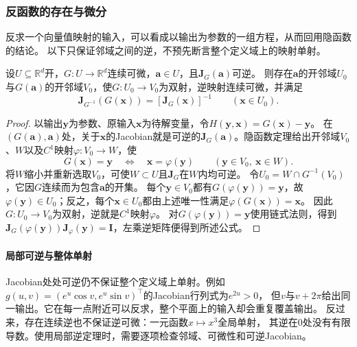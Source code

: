 \subsubsection{反函数的存在与微分}

反求一个向量值映射的输入，可以看成以输出为参数的一组方程，从而回用隐函数的结论。
以下只保证邻域之间的逆，不预先断言整个定义域上的映射单射。
\begin{theorem}[局部反函数定理]
\label{thm:multivariable-inverse-function}
设$U\subseteq\mathbb R^d$开，$G:U\to\mathbb R^d$连续可微，$\bm a\in U$，且$\bm J_G(\bm a)$可逆。
则存在$\bm a$的开邻域$U_0$与$G(\bm a)$的开邻域$V_0$，使$G:U_0\to V_0$为双射，逆映射连续可微，并满足
\[
 \bm J_{G^{-1}}(G(\bm x))=[\bm J_G(\bm x)]^{-1}
 \qquad(\bm x\in U_0).
\]
\end{theorem}
\begin{proof}
以输出$\bm y$为参数、原输入$\bm x$为待解变量，令$H(\bm y,\bm x)=G(\bm x)-\bm y$。
在$(G(\bm a),\bm a)$处，关于$\bm x$的Jacobian就是可逆的$\bm J_G(\bm a)$。隐函数定理给出开邻域$V_0$、$W$以及$C^1$映射$\varphi:V_0\to W$，使
\[
 G(\bm x)=\bm y\quad\Longleftrightarrow\quad\bm x=\varphi(\bm y)
 \qquad(\bm y\in V_0,\ \bm x\in W).
\]
将$W$缩小并重新选取$V_0$，可使$W\subset U$且$\bm J_G$在$W$内均可逆。
令$U_0=W\cap G^{-1}(V_0)$，它因$G$连续而为包含$\bm a$的开集。
每个$\bm y\in V_0$都有$G(\varphi(\bm y))=\bm y$，故$\varphi(\bm y)\in U_0$；反之，每个$\bm x\in U_0$都由上述唯一性满足$\varphi(G(\bm x))=\bm x$。
因此$G:U_0\to V_0$为双射，逆就是$C^1$映射$\varphi$。
对$G(\varphi(\bm y))=\bm y$使用链式法则，得到$\bm J_G(\varphi(\bm y))\bm J_\varphi(\bm y)=\bm I$，左乘逆矩阵便得到所述公式。
\end{proof}

\paragraph{局部可逆与整体单射}

Jacobian处处可逆仍不保证整个定义域上单射。例如
$g(u,v)=(e^u\cos v,e^u\sin v)^\top$的Jacobian行列式为$e^{2u}>0$，
但$v$与$v+2\pi$给出同一输出。它在每一点附近可以反求，整个平面上的输入却会重复覆盖输出。
反过来，存在连续逆也不保证逆可微：一元函数$x\mapsto x^3$全局单射，
其逆在$0$处没有有限导数。使用局部逆定理时，需要逐项检查邻域、可微性和可逆Jacobian。

\FloatBarrier
